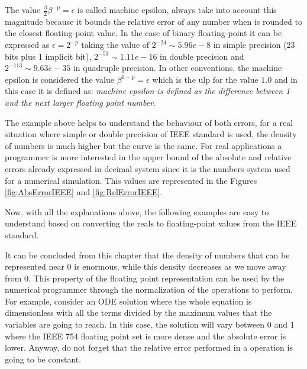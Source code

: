 \begin{IN}
    The value $\frac{\beta}{2}\beta^{-p} = \epsilon$ is called machine epsilon, always take into account this magnitude because it bounds the 
    relative error of any number when is rounded to the closest floating-point value. In the case of binary floating-point it can be 
    expressed as $\epsilon = 2^{-p}$ taking the value of $2^{-24} \sim 5.96e-8$ in simple precision (23 bits plus 1 implicit bit), $2^{-53} 
    \sim 1.11e-16$ in double precision and $2^{-113} \sim 9.63e-35$ in quadruple precision. In other conventions, the machine epsilon is 
    considered the value $\beta^{1-p} = \epsilon$ which is the ulp for the value $1.0$ and in this case it is defined as: \textit{machine 
    epsilon is defined as the difference between 1 and the next larger floating point number}.
\end{IN}

The example above helps to understand the behaviour of both errors, for a real situation where simple or double precision of IEEE standard is 
used, the density of numbers is much higher but the curve is the same. For real applications a programmer is more interested in the upper 
bound of the absolute and relative errors already expressed in decimal system since it is the numbers system used for a numerical simulation. 
This values are represented in the Figures \ref{fig:AbsErrorIEEE} and \ref{fig:RelErrorIEEE}.

Now, with all the explanations above, the following examples are easy to understand based on converting the reals to floating-point values 
from the IEEE standard. 

It can be concluded from this chapter that the density of numbers that can be represented near 0 is enormous, while this density decreases as 
we move away from 0. This property of the floating point representation can be used by the numerical programmer through the normalization of 
the operations to perform. For example, consider an ODE solution where the whole equation is dimensionless with all the terms divided by the 
maximum values that the variables are going to reach. In this case, the solution will vary between 0 and 1 where the IEEE 754 floating point 
set is more dense and the absolute error is lower. Anyway, do not forget that the relative error performed in a operation is going to be 
constant. 


